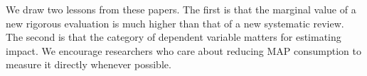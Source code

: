 \documentclass[sn-nature,referee,pdflatex]{sn-jnl}
\begin{document}
We draw two lessons from these papers. The first is that the marginal
value of a new rigorous evaluation is much higher than that of a new
systematic review. The second is that the category of dependent variable
matters for estimating impact. We encourage researchers who care about
reducing MAP consumption to measure it directly whenever possible.

\begin{comment}
First I feel a little strange saying that the marginal value of a review is low (then whay are we writing this paper?) Second, maybe there's a space for discussion about what counts as  meaningful? mention that ease of implementation matters in terms of what’s meaningful. The costs of fully exposing one person is the relevant denominator. The costs of recruitment are part of the cost. Maybe some people are more amenable to nudges after hearing an argument for
\end{comment}

\newpage

\renewcommand\refname{References}

\end{document}
